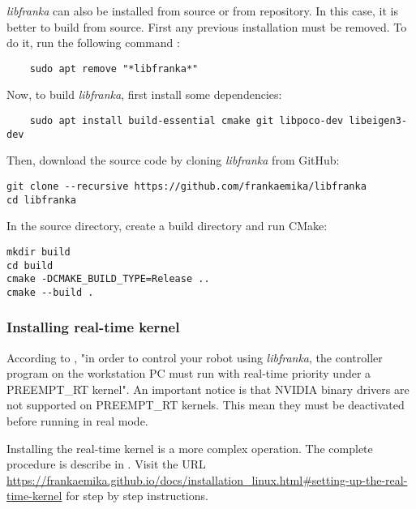 \textit{libfranka} can also be installed from source or from repository. In this case, it is better to build from source. 
First any previous installation must be removed. To do it, run the following command \cite{FrankaEmikaGmbH_fci_documentation}:

\begin{verbatim}
    sudo apt remove "*libfranka*"
\end{verbatim}

Now, to build \textit{libfranka}, first install some dependencies:

\begin{verbatim}
    sudo apt install build-essential cmake git libpoco-dev libeigen3-dev
\end{verbatim}

Then, download the source code by cloning \textit{libfranka} from GitHub:

\begin{verbatim}
git clone --recursive https://github.com/frankaemika/libfranka
cd libfranka
\end{verbatim}

In the source directory, create a build directory and run CMake:

\begin{verbatim}
mkdir build
cd build
cmake -DCMAKE_BUILD_TYPE=Release ..
cmake --build .
\end{verbatim}


\subsubsection*{Installing real-time kernel}
\label{subsubsec:ros_setup_robotic_system_integration_ros_installation_realtime_kernel}

According to \cite{FrankaEmikaGmbH_fci_documentation}, "in order to control your robot using \textit{libfranka}, the controller program on the workstation PC must run with real-time priority under a PREEMPT\_RT kernel". An important notice is that NVIDIA binary drivers are not supported on PREEMPT\_RT kernels. This mean they must be deactivated before running in real mode.

Installing the real-time kernel is a more complex operation. The complete procedure is describe in \cite{FrankaEmikaGmbH_fci_documentation}. Visit the URL \url{https://frankaemika.github.io/docs/installation_linux.html#setting-up-the-real-time-kernel} for step by step instructions.

